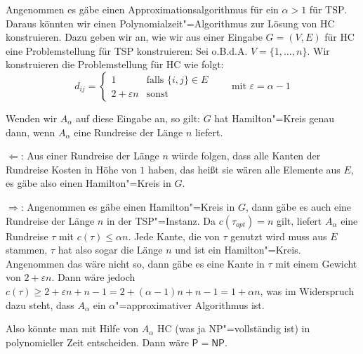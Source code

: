 \begin{Bew}
  \hspace{\parindent}Angenommen es gäbe einen Approximationsalgorithmus für ein $\alpha > 1$ für \textsc{TSP}. Daraus könnten wir einen Polynomialzeit"=Algorithmus zur Lösung von \textsc{HC} konstruieren. Dazu geben wir an, wie wir aus einer Eingabe $G=(V,E)$ für \textsc{HC} eine Problemstellung für \textsc{TSP} konstruieren: Sei o.B.d.A. $V=\{1, \ldots, n\}$. Wir konstruieren die Problemstellung für \textsc{HC} wie folgt:
  \[ d_{ij} = \begin{cases} 1 & \text{falls } \{i,j\} \in E \\ 2 + \varepsilon n & \text{sonst}\end{cases} \qquad \text{mit } \varepsilon = \alpha -1 \]
  
  Wenden wir $A_\alpha$ auf diese Eingabe an, so gilt: $G$ hat Hamilton"=Kreis genau dann, wenn $A_\alpha$ eine Rundreise der Länge $n$ liefert.
  
  \glq$\Leftarrow$\grq: Aus einer Rundreise der Länge $n$ würde folgen, dass alle Kanten der Rundreise Kosten in Höhe von $1$ haben, das heißt sie wären alle Elemente aus $E$, es gäbe also einen Hamilton"=Kreis in $G$.
  
  \glq$\Rightarrow$\grq: Angenommen es gäbe einen Hamilton"=Kreis in $G$, dann gäbe es auch eine Rundreise der Länge $n$ in der \textsc{TSP}"=Instanz. Da $c(\tau_{opt}) = n$ gilt, liefert $A_{\alpha}$ eine Rundreise $\tau$ mit $c(\tau) \le \alpha n$. Jede Kante, die von $\tau$ genutzt wird muss aus $E$ stammen, $\tau$ hat also sogar die Länge $n$ und ist ein Hamilton"=Kreis. Angenommen das wäre nicht so, dann gäbe es eine Kante in $\tau$ mit einem Gewicht von $2 + \varepsilon n$. Dann wäre jedoch $c(\tau) \ge 2 + \varepsilon n + n - 1 = 2 + (\alpha - 1) n + n -1 = 1 + \alpha n$, was im Widerspruch dazu steht, dass $A_\alpha$ ein $\alpha$"=approximativer Algorithmus ist.
\end{Bew}

Also könnte man mit Hilfe von $A_{\alpha}$ \textsc{HC} (was ja \textsf{NP}"=vollständig ist) in polynomieller Zeit entscheiden. Dann wäre $\mathsf{P} = \mathsf{NP}$.

